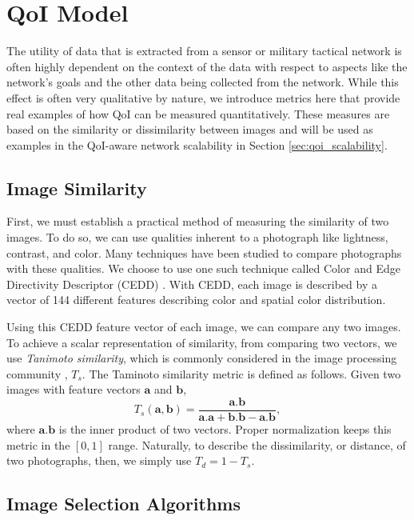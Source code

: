 
\section{QoI Model}
\label{sec:qoi_model}

The utility of data that is extracted from a sensor or military tactical network is often highly dependent on the context of the data with respect to aspects like the network's goals and the other data being collected from the network.  While this effect is often very qualitative by nature, we introduce metrics here that provide real examples of how QoI can be measured quantitatively.  These measures are based on the similarity or dissimilarity between images and will be used as examples in the QoI-aware network scalability in Section \ref{sec:qoi_scalability}.  

\subsection{Image Similarity}

First, we must establish a practical method of measuring the similarity of two images.  To do so, we can use qualities inherent to a photograph like lightness, contrast, and color.  Many techniques have been studied to compare photographs with these qualities.  We choose to use one such technique called Color and Edge Directivity Descriptor (CEDD) \cite{2008cedd}.  With CEDD, each image is described by a vector of 144 different features describing color and spatial color distribution.  

Using this CEDD feature vector of each image, we can compare any two images.  To achieve a scalar representation of similarity, from comparing two vectors, we use \emph{Tanimoto similarity}, which is commonly considered in the image processing community \cite{tanimoto}, $T_s$. The Taminoto similarity metric is defined as follows. Given two images with feature vectors $\mathbf{a}$ and $\mathbf{b}$,
  \begin{equation}
  T_s(\mathbf{a,b})=\frac{\mathbf{a.b}}{\mathbf{a.a+b.b-a.b}},
  \end{equation}
where $\mathbf{a.b}$ is the inner product of two vectors. Proper normalization keeps this metric in the $[0,1]$ range. Naturally, to describe the dissimilarity, or distance, of two photographs, then, we simply use $T_d = 1 - T_s$.

\subsection{Image Selection Algorithms}

